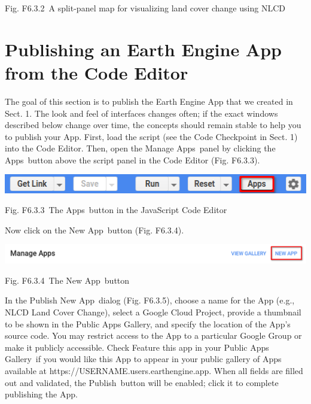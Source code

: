 \documentclass[
  letterpaper,
  DIV=11,
  numbers=noendperiod]{scrreprt}
\begin{document}
Fig. F6.3.2~A split-panel map for visualizing land cover change using
NLCD

\hypertarget{publishing-an-earth-engine-app-from-the-code-editor}{%
\section{Publishing an Earth Engine App from the Code
Editor}\label{publishing-an-earth-engine-app-from-the-code-editor}}

The goal of this section is to publish the Earth Engine App that we
created in Sect. 1. The look and feel of interfaces changes often; if
the exact windows described below change over time, the concepts should
remain stable to help you to publish your App. First, load the script
(see the Code Checkpoint in Sect. 1) into the Code Editor. Then, open
the Manage Apps~panel by clicking the Apps~button above the script panel
in the Code Editor (Fig. F6.3.3).

\includegraphics{./F6/image14.png}

Fig. F6.3.3~The Apps~button in the JavaScript Code Editor

Now click on the New App~button (Fig. F6.3.4).

\includegraphics{./F6/image61.png}

Fig. F6.3.4~The New App~button

In the Publish New App~dialog (Fig. F6.3.5), choose a name for the App
(e.g., NLCD Land Cover Change), select a Google Cloud Project, provide a
thumbnail to be shown in the Public Apps Gallery, and specify the
location of the App's source code. You may restrict access to the App to
a particular Google Group or make it publicly accessible. Check Feature
this app in your Public Apps Gallery~if you would like this App to
appear in your public gallery of Apps available at
https://USERNAME.users.earthengine.app. When all fields are filled out
and validated, the Publish~button will be enabled; click it to complete
publishing the App.~
\end{document}
